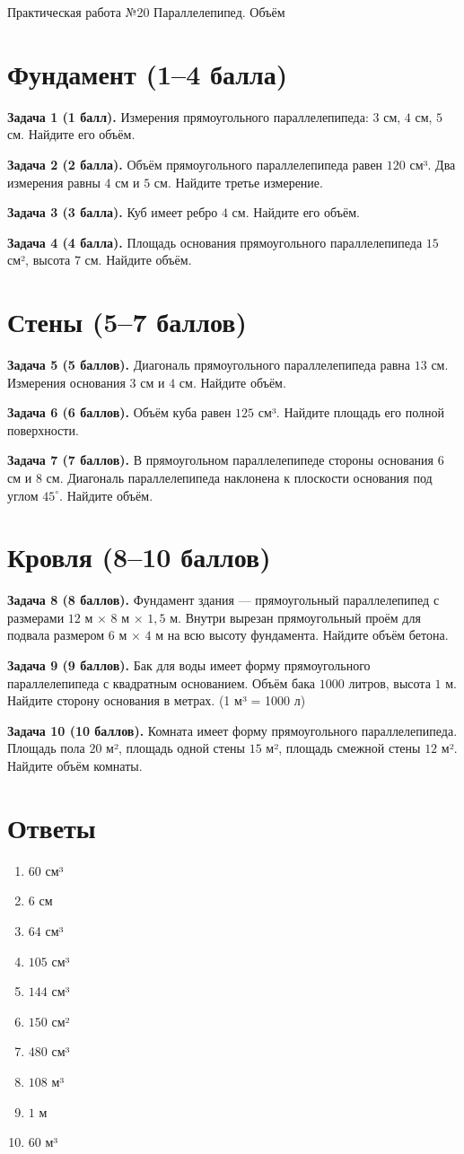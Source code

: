 \documentclass{umk-matematika}
\begin{document}
\maketitlepage
    {Практическая работа №20}
    {Параллелепипед. Объём}
    {}

\section{Фундамент (1--4 балла)}

\textbf{Задача 1 (1 балл).} Измерения прямоугольного параллелепипеда: $3$ см, $4$ см, $5$ см. Найдите его объём.

\textbf{Задача 2 (2 балла).} Объём прямоугольного параллелепипеда равен $120$ см³. Два измерения равны $4$ см и $5$ см. Найдите третье измерение.

\textbf{Задача 3 (3 балла).} Куб имеет ребро $4$ см. Найдите его объём.

\textbf{Задача 4 (4 балла).} Площадь основания прямоугольного параллелепипеда $15$ см², высота $7$ см. Найдите объём.

\section{Стены (5--7 баллов)}

\textbf{Задача 5 (5 баллов).} Диагональ прямоугольного параллелепипеда равна $13$ см. Измерения основания $3$ см и $4$ см. Найдите объём.

\textbf{Задача 6 (6 баллов).} Объём куба равен $125$ см³. Найдите площадь его полной поверхности.

\textbf{Задача 7 (7 баллов).} В прямоугольном параллелепипеде стороны основания $6$ см и $8$ см. Диагональ параллелепипеда наклонена к плоскости основания под углом $45^\circ$. Найдите объём.

\section{Кровля (8--10 баллов)}

\textbf{Задача 8 (8 баллов).} Фундамент здания — прямоугольный параллелепипед с размерами $12$ м × $8$ м × $1{,}5$ м. Внутри вырезан прямоугольный проём для подвала размером $6$ м × $4$ м на всю высоту фундамента. Найдите объём бетона.

\textbf{Задача 9 (9 баллов).} Бак для воды имеет форму прямоугольного параллелепипеда с квадратным основанием. Объём бака $1000$ литров, высота $1$ м. Найдите сторону основания в метрах. (1 м³ = 1000 л)

\textbf{Задача 10 (10 баллов).} Комната имеет форму прямоугольного параллелепипеда. Площадь пола $20$ м², площадь одной стены $15$ м², площадь смежной стены $12$ м². Найдите объём комнаты.

\newpage
\section*{Ответы}

\begin{enumerate}
  \item $60$ см³
  \item $6$ см
  \item $64$ см³
  \item $105$ см³
  \item $144$ см³
  \item $150$ см²
  \item $480$ см³
  \item $108$ м³
  \item $1$ м
  \item $60$ м³
\end{enumerate}
\end{document}
